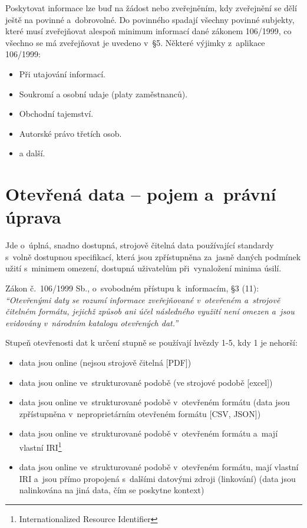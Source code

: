 Poskytovat informace lze buď na žádost nebo zveřejněním, kdy zveřejnění se dělí ještě na povinné a~dobrovolné. Do povinného spadají všechny povinné subjekty, které musí zveřejňovat alespoň minimum informací dané zákonem 106/1999, co všechno se má zveřejňovat je uvedeno v~§5. Některé výjimky z~aplikace 106/1999:
\begin{itemize}[noitemsep]
    \item Při utajování informací.
    \item Soukromí a osobní udaje (platy zaměstnanců).
    \item Obchodní tajemství.
    \item Autorské právo třetích osob.
    \item a další.
\end{itemize}

\clearpage
\section{Otevřená data -- pojem a~právní úprava}

Jde o~úplná, snadno dostupná, strojově čitelná data používající standardy s~volně dostupnou specifikací, která jsou zpřístupněna za~jasně daných podmínek užití s~minimem omezení, dostupná uživatelům při~vynaložení minima úsilí.

Zákon č.~106/1999 Sb., o~svobodném přístupu k~informacím, §3 (11): \emph{\enquote{Otevřenými daty se rozumí informace zveřejňované v~otevřeném a~strojově čitelném formátu, jejichž způsob ani účel následného využití není omezen a~jsou evidovány v~národním katalogu otevřených dat.}}

Stupeň otevřenosti dat k určení stupně se používají hvězdy 1-5, kdy 1 je nehorší:
\begin{itemize}[noitemsep]
\item data jsou online (nejsou strojově čitelná [PDF])
\item data jsou online ve~strukturované podobě (ve strojové podobě [excel])
\item data jsou online ve~strukturované podobě v~otevřeném formátu (data jsou zpřístupněna v~neproprietárním otevřeném formátu [CSV, JSON])
\item data jsou online ve~strukturované podobě v~otevřeném formátu a~mají vlastní IRI\footnote{Internationalized Resource Identifier} 
\item data jsou online ve~strukturované podobě v~otevřeném formátu, mají vlastní IRI a~jsou přímo propojená s~dalšími datovými zdroji (linkování) (data jsou nalinkována na jiná data, čím se poskytne kontext)
\end{itemize}

